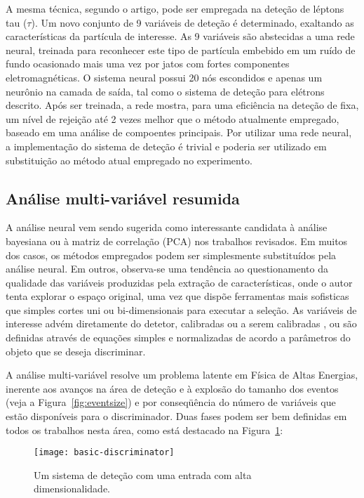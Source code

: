 A mesma técnica, segundo o artigo, pode ser empregada na deteção de léptons
tau ($\tau$). Um novo conjunto de 9 variáveis de deteção é determinado,
exaltando as características da partícula de interesse. As 9 variáveis são
abstecidas a uma rede neural, treinada para reconhecer este tipo de partícula
embebido em um ruído de fundo ocasionado mais uma vez por jatos com fortes
componentes eletromagnéticas. O sistema neural possui 20 nós escondidos e
apenas um neurônio na camada de saída, tal como o sistema de deteção para
elétrons descrito. Após ser treinada, a rede mostra, para uma eficiência na
deteção de  fixa, um nível de rejeição até 2 vezes melhor que o
método atualmente empregado, baseado em uma análise de compoentes
principais. Por utilizar uma rede neural, a implementação do sistema de
deteção é trivial e poderia ser utilizado em substituição ao método atual
empregado no experimento.

\subsection{Análise multi-variável resumida}

A análise neural vem sendo sugerida como interessante candidata à análise
bayesiana ou à matriz de correlação (PCA) nos trabalhos revisados. Em muitos
dos casos, os métodos empregados podem ser simplesmente substituídos pela
análise neural. Em outros, observa-se uma tendência ao questionamento da
qualidade das variáveis produzidas pela extração de características, onde o
autor tenta explorar o espaço original, uma vez que dispõe ferramentas mais
sofisticas que simples cortes uni ou bi-dimensionais para executar a
seleção. As variáveis de interesse advém diretamente do detetor, calibradas ou
a serem calibradas \cite{silva-acat-2001}, ou são definidas através de
equações simples e normalizadas de acordo a parâmetros do objeto que se deseja
discriminar.

A análise multi-variável resolve um problema latente em Física de Altas
Energias, inerente aos avanços na área de deteção e à explosão do tamanho dos
eventos (veja a Figura~\ref{fig:eventsize}) e por conseqüência do número de
variáveis que estão disponíveis para o discriminador. Duas fases podem ser bem
definidas em todos os trabalhos nesta área, como está destacado na
Figura~\ref{fig:basic-discriminator}:

\begin{figure}
\begin{center}
\texttt{[image: basic-discriminator]}
\end{center}
\caption{Um sistema de deteção com uma entrada com alta dimensionalidade.}
\label{fig:basic-discriminator}
\end{figure}

